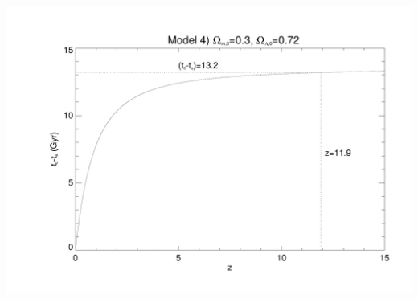 \documentclass[a4paper,12pt]{article}
\begin{document}
\begin{itemize}
\centerline{\includegraphics[scale=0.6]{advanced_part6d.pdf}}

\end{itemize}
\end{document}
